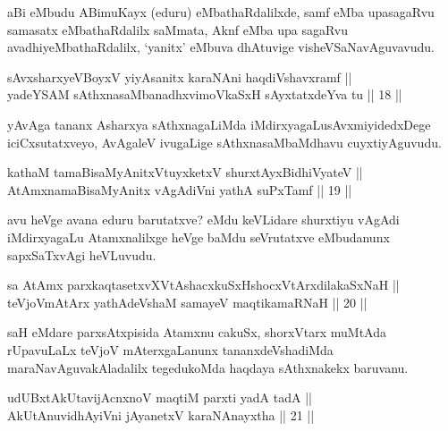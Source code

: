 \begin{artha}
aBi eMbudu ABimuKayx (eduru) eMbathaRdalilxde, samf eMba upasagaRvu
samasatx eMbathaRdalilx saMmata, Aknf eMba upa sagaRvu
avadhiyeMbathaRdalilx, `yanitx' eMbuva dhAtuvige visheVSaNavAguvavudu.
\end{artha}

\begin{shl}
sAvxsharxyeVBoyxV yiyAsanitx karaNAni haqdiVshavxramf || \\
yadeYSAM sAthxnasaMbanadhxvimoVkaSxH sAyxtatxdeYva tu \hfill || 18 ||
  
\end{shl}

\begin{artha}
yAvAga tananx Asharxya sAthxnagaLiMda iMdirxyagaLu\break sAvxmiyidedxDege
iciCxsutatxveyo, AvAgaleV ivugaLige sAthxna\break saMbaMdhavu cuyxtiyAguvudu.
\end{artha}

\begin{shl}
kathaM tamaBisaMyAnitxVtuyxketxV shurxtAyx\s BidhiVyateV || \\
AtAmxnamaBisaMyAnitx vAgAdiVni yathA suPxTamf \hfill || 19 ||
 
\end{shl}

\begin{artha}
avu heVge avana eduru barutatxve? eMdu keVLidare shurxtiyu vAgAdi
iMdirxyagaLu Atamxnalilxge heVge baMdu seVrutatxve eMbudanunx
sapxSaTxvAgi heVLuvudu.
\end{artha}


\begin{shl}
sa AtAmx parxkaqtasetxvXVtAshacxkuSxHshocxVtArxdilakaSxNaH ||  \\
teVjoVmAtArx yathAdeVshaM samayeV maqtikamaRNaH \hfill || 20 ||
  
\end{shl}

\begin{artha}
saH eMdare parxsAtxpisida Atamxnu cakuSx, shorxVtarx muMtAda
rUpavuLaLx teVjoV mAterxgaLanunx tananxdeVshadiMda
maraNavAguvakAladalilx tegedukoMda haqdaya sAthxnakekx baruvanu.
\end{artha}

\begin{shl}
udUBxtAkUtavijAcnxnoV maqtiM parxti yadA tadA || \\
AkUtAnuvidhAyiVni jAyanetxV karaNAnayxtha \hfill || 21 ||
  
\end{shl}

